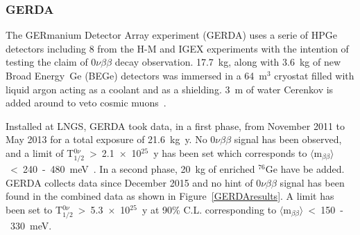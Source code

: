 \documentclass[main.tex]{subfiles}
\begin{document}
\subsubsection{GERDA}


\NI The GERmanium Detector Array experiment (GERDA) uses a serie of HPGe detectors including 8 from the H-M and IGEX experiments with the intention of testing the claim of 0$\nu\beta\beta$ decay observation. 17.7~kg, along with 3.6~kg of new Broad Energy~Ge (BEGe) detectors was immersed in a 64~m$^\text{3}$ cryostat filled with liquid argon acting as a coolant and as a shielding. 3~m of water Cerenkov is added around to veto cosmic muons~\cite{GERDA}.


\bigskip 


\NI Installed at LNGS, GERDA took data, in a first phase, from November 2011 to May 2013 for a total exposure of 21.6~kg~y. No 0$\nu\beta\beta$ signal has been observed, and a limit of T$_{\text{1/2}}^{0\nu}$~>~2.1~$\times$~10$^{\text{25}}$~y has been set which corresponds to $\langle \text{m}_{\beta\beta} \rangle$~<~240~-~480~meV~\cite{GERDA}. In a second phase, 20~kg of enriched $^{\text{76}}$Ge have be added. GERDA collects data since December 2015 and no hint of 0$\nu\beta\beta$ signal has been found in the combined data as shown in Figure~\ref{GERDAresults}. A limit has been set to T$_{\text{1/2}}^{0\nu}$~>~5.3~$\times$~10$^{\text{25}}$~y at 90\% C.L. corresponding to $\langle \text{m}_{\beta\beta} \rangle$~<~150~-~330~meV.
\end{document}
